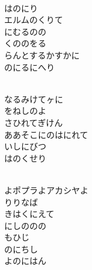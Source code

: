 \documentclass[10pt,b5j]{tarticle} %
\begin{document}
\begin{enumerate}
\begin{minipage}[c]{\blocksize}
        \vspace{\linespace}
        \item~\\
        はのにり\\
        エルムのくりて\\
        にむるのの\\
        くののをる\\
        らんとするかすかに\\
        のにるにへり
        
        \vspace{\linespace}
        \item~\\
        なるみけてヶに\\
        をねしのよ\\
        さひれてぎけん\\
        ああそこにのはにれて\\
        いしにびつ\\
        はのくせり
        
        \vspace{\linespace}
        \item~\\
        よポプラよアカシヤよ\\
        りりなば\\
        きはくにえて\\
        にしののの\\
        もひじ\\
        のにちし\\
        よのにはん
    
    \end{minipage}
\end{enumerate} %
\end{document}
